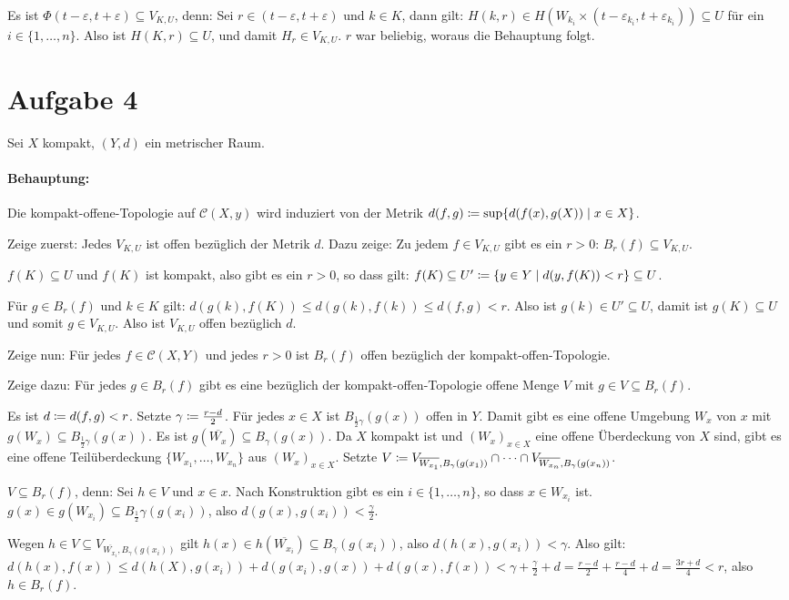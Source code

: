 \documentclass{article}
\begin{document}
Es ist $\Phi(t-\varepsilon, t+\varepsilon)\subseteq V_{K,U}$, denn: Sei $r\in(t-\varepsilon, t+\varepsilon)$ und $k\in K$, dann gilt: $H(k,r) \in H( W_{k_i} \times (t-\varepsilon_{k_i}, t+ \varepsilon_{k_i}))\subseteq U$ für ein $i\in\{1,\ldots,n\}$.
Also ist $H(K,r)\subseteq U$, und damit $H_r \in V_{K,U}$. $r$ war beliebig, woraus die Behauptung folgt.

\section*{Aufgabe 4}

Sei $X$ kompakt, $(Y,d)$ ein metrischer Raum.

\paragraph{Behauptung:} Die kompakt-offene-Topologie auf $\mathcal C(X,y)$ wird induziert von der Metrik $d(f,g)\da \sup\{d(f(x),g(X))\mid x\in X\}$.

Zeige zuerst: Jedes $V_{K,U}$ ist offen bezüglich der Metrik $d$. Dazu zeige: Zu jedem $f\in V_{K,U}$ gibt es ein $r>0$: $B_r(f)\subseteq V_{K,U}$.

$f(K)\subseteq U$ und $f(K)$ ist kompakt, also gibt es ein $r>0$, so dass gilt: $f(K)\subseteq U'\da \{y\in Y\mid d(y,f(K)) < r\}\subseteq U$.

Für $g\in B_r(f)$ und $k\in K$ gilt: $d(g(k),f(K))\le d(g(k),f(k))\le d(f,g) < r$. Also ist $g(k)\in U'\subseteq U$, damit ist $g(K)\subseteq U$ und somit $g\in V_{K,U}$. Also ist $V_{K,U}$ offen bezüglich $d$.

Zeige nun: Für jedes $f\in \mathcal C(X,Y)$ und jedes $r>0$ ist $B_r(f)$ offen bezüglich der kompakt-offen-Topologie.

Zeige dazu: Für jedes $g\in B_r(f)$ gibt es eine bezüglich der kompakt-offen-Topologie offene Menge $V$ mit $g\in V\subseteq B_r(f)$.

Es ist $d\da d(f,g)<r$. Setzte $\gamma \da \frac{r-d}2$. Für jedes $x\in X$ ist $B_{\frac 12 \gamma}(g(x))$ offen in $Y$. Damit gibt es eine offene Umgebung $W_x$ von $x$ mit $g(W_x)\subseteq  B_{\frac 12 \gamma}(g(x))$. Es ist $g(\overline{W_x})\subseteq B_\gamma(g(x))$. Da $X$ kompakt ist und $(W_x)_{x\in X}$ eine offene Überdeckung von $X$ sind, gibt es eine offene Teilüberdeckung $\{W_{x_1},\ldots,W_{x_n}\}$ aus $(W_x)_{x\in X}$. Setzte $V\da V_{\overline{W_{x_1}},B_\gamma(g(x_1))} \cap \cdots \cap V_{\overline{W_{x_n}},B_\gamma(g(x_n))}$.

$V\subseteq B_r(f)$, denn: Sei $h\in V$ und $x\in x$. Nach Konstruktion gibt es ein $i\in\{1,\ldots,n\}$, so dass $x\in W_{x_i}$ ist. $g(x)\in g(W_{x_i}) \subseteq B_{\frac12} \gamma(g(x_i))$, also $d(g(x),g(x_i))<\frac\gamma2$.

Wegen $h\in V\subseteq V_{\overline{W_{x_i}}, B_\gamma(g(x_i))}$ gilt $h(x) \in h(\overline{W_{x_i}}) \subseteq B_\gamma(g(x_i))$, also $d(h(x),g(x_i))<\gamma$. Also gilt: $d(h(x),f(x)) \le d(h(X),g(x_i)) + d(g(x_i),g(x)) + d(g(x),f(x)) < \gamma + \frac \gamma2 + d = \frac{r-d}2 + \frac{r-d}4 + d = \frac{3r+d}4 < r$, also $h\in B_r(f)$.
\end{document}
